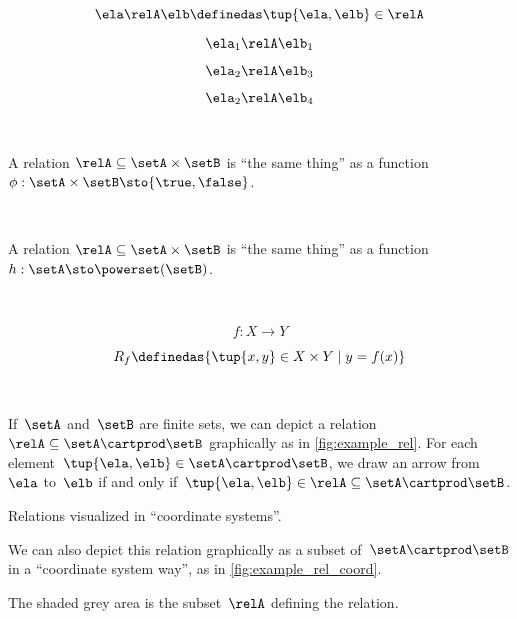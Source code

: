 {    \begin{equation}
        \ela \relA \elb \definedas \tup{\ela, \elb} \in \relA  \label{eq:slides-15}
    \end{equation}

    $$ \ela_1 \relA \elb_1 \label{eq:slides-16}$$

    $$ \ela_2 \relA \elb_3 \label{eq:slides-17}$$

    $$ \ela_2 \relA \elb_4 \label{eq:slides-18}$$

    \

    A relation $\relA \subseteq \setA \times \setB$ is ``the same thing'' as a function $\phi : \setA \times \setB \sto \{\true, \false\}$.

    \


    A relation $\relA \subseteq \setA \times \setB$ is ``the same thing'' as a function $h : \setA  \sto \powerset (\setB)$.

    \

    $$
    f : X \to Y
    $$


    $$
    R_f \definedas \{ \tup{x, y} \in X \times Y \mid y = f(x) \}
    $$


}

\


\begin{marginfigure}
    \centering
    \caption{}
    \label{fig:example_rel}
\end{marginfigure}

If~$\setA$ and~$\setB$ are finite sets, we can depict a relation~$\relA \subseteq \setA \cartprod \setB$ graphically as in \cref{fig:example_rel}. For each element~$\tup{\ela,\elb} \in \setA \cartprod \setB$, we draw an arrow from~$\ela$ to~$\elb$ if and only if~$\tup{\ela,\elb} \in \relA \subseteq \setA \cartprod \setB$.


\begin{marginfigure}
    \begin{center}
    \end{center}
    \caption{Relations visualized in ``coordinate systems''.}
    \label{fig:example_rel_coord}
\end{marginfigure}

We can also depict this relation graphically as a subset of~$\setA \cartprod \setB$ in a ``coordinate system way'', as in \cref{fig:example_rel_coord}.

The shaded grey area is the subset~$\relA$ defining the relation.


